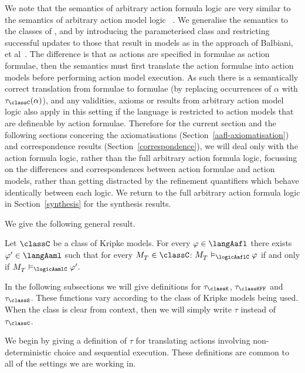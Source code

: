 We note that the semantics of arbitrary action formula logic \logicAaflC{} are very similar to the semantics of arbitrary action model logic \logicAamlC{}~\cite{hales:2013}.
We generalise the semantics to the classes of \classK{}, \classKFF{} and \classS{} by introducing the parameterised class \classC{} and restricting successful updates to those that result in \classC{} models as in the approach of Balbiani, et al~\cite{balbiani:2012}.
The difference is that as actions are specified in \langAafl{} formulae as action formulae, then the semantics must first translate the action formulae into action models before performing action model execution.
As such there is a semantically correct translation from \langAafl{} formulae to \langAaml{} formulae (by replacing occurrences of $\alpha$ with $\tau_\classC(\alpha)$), and any validities, axioms or results from arbitrary action model logic also apply in this setting if the language is restricted to action models that are defineable by action formulae.
Therefore for the current section and the following sections concering the axiomatisations (Section~\ref{aafl-axiomatisation}) and correspondence results (Section~\ref{correspondence}), we will deal only with the action formula logic, rather than the full arbitrary action formula logic, focussing on the differences and correspondences between action formulae and action models, rather than getting distracted by the refinement quantifiers which behave identically between each logic.
We return to the full arbitrary action formula logic in Section~\ref{synthesis} for the synthesis results.

We give the following general result.

\begin{proposition}
    Let $\classC$ be a class of Kripke models.
    For every $\phi \in \langAafl$ there exists $\phi' \in \langAaml$ such that for every $\kPModel{\kStatesT} \in \classC$: $\kPModel{\kStatesT} \entails_\logicAaflC \phi$ if and only if $\kPModel{\kStatesT} \entails_\logicAamlC \phi'$.
\end{proposition}

In the following subsections we will give definitions for $\tau_\classK$, $\tau_\classKFF$ and $\tau_\classS$.
These functions vary according to the class of Kripke models being used. When the class is clear from context, then we will simply write $\tau$ instead of $\tau_\classC$.

We begin by giving a definition of $\tau$ for translating actions involving non-deterministic choice and sequential execution.
These definitions are common to all of the settings we are working in.

